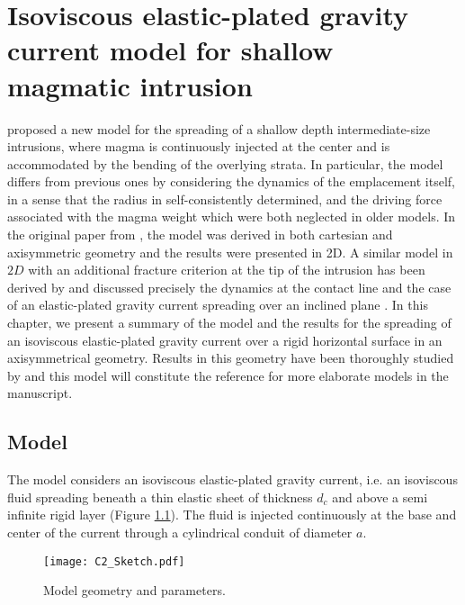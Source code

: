 \chapter{Isoviscous elastic-plated  gravity current model  for shallow
  magmatic intrusion}

\label{chap2} 
\minitoc

\citet{Michaut:2011kg} proposed  a new  model for  the spreading  of a
shallow   depth   intermediate-size   intrusions,   where   magma   is
continuously injected at the center and is accommodated by the bending
of  the  overlying strata.   In  particular,  the model  differs  from
previous ones by  considering the dynamics of  the emplacement itself,
in a  sense that the  radius in self-consistently determined,  and the
driving  force  associated  with  the magma  weight  which  were  both
neglected   in   older   models.    In   the   original   paper   from
\citet{Michaut:2011kg}, the  model was  derived in both  cartesian and
axisymmetric geometry and the results  were presented in 2D. A similar
model in $2D$ with an additional  fracture criterion at the tip of the
intrusion    has   been    derived   by    \citet{Bunger:2011cb}   and
\citet{Anonymous:QWXp_4JV}  discussed precisely  the  dynamics at  the
contact  line  and  the  case of  an  elastic-plated  gravity  current
spreading over an inclined  plane \citep{Anonymous:QWXp_4JV}.  In this
chapter, we  present a summary  of the model  and the results  for the
spreading of an isoviscous elastic-plated gravity current over a rigid
horizontal  surface in  an axisymmetrical  geometry.  Results  in this
geometry  have been  thoroughly studied  by \citet{Lister:2013ia}  and
this model will constitute the  reference for more elaborate models in
the manuscript.

\section{Model}
\label{C2-sec:model}

The model considers an isoviscous elastic-plated gravity current, i.e.
an  isoviscous  fluid  spreading  beneath  a  thin  elastic  sheet  of
thickness   $d_c$   and   above    a   semi   infinite   rigid   layer
\citep{Michaut:2011kg,Bunger:2011cb}  (Figure  \ref{C2-Sketch}).   The
fluid is injected continuously at the base and center of the current
through a cylindrical conduit of diameter $a$. 




\begin{figure}[htbp]
  \begin{center}
    \graphicspath{ {/Users/thorey/Documents/These/Manuscript/Figure/Chapter2/} }
    \texttt{[image: C2\_Sketch.pdf]}
    \caption{Model geometry and parameters.}
    \label{C2-Sketch}
  \end{center}
\end{figure}

